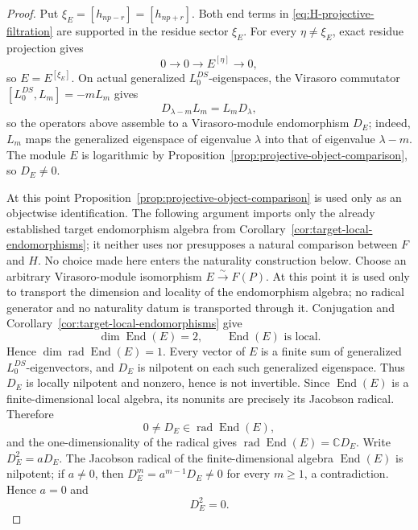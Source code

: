 \documentclass[12pt,leqno]{amsart}
\numberwithin{equation}{section}
\newcommand{\End}{\operatorname{End}}
\newcommand{\rad}{\operatorname{rad}}
\def\C{\mathbb{C}}
\begin{document}
\begin{proof}
Put $\xi_E=[h_{np-r}]=[h_{np+r}]$.  Both end terms in
\eqref{eq:H-projective-filtration} are supported in the residue sector
$\xi_E$.  For every $\eta\ne\xi_E$, exact residue projection gives
\[
 0\longrightarrow0\longrightarrow E^{[\eta]}\longrightarrow0,
\]
so $E=E^{[\xi_E]}$.  On actual generalized $L^{DS}_0$-eigenspaces, the
Virasoro commutator $[L^{DS}_0,L_m]=-mL_m$ gives
\[
 D_{\lambda-m}L_m=L_mD_\lambda,
\]
so the operators above assemble to a Virasoro-module endomorphism $D_E$;
indeed, $L_m$ maps the generalized eigenspace of eigenvalue $\lambda$
into that of eigenvalue $\lambda-m$.  The module $E$ is logarithmic by
Proposition~\ref{prop:projective-object-comparison}, so $D_E\ne0$.

At this point Proposition~\ref{prop:projective-object-comparison} is used
only as an objectwise identification.  The following argument imports
only the already established target endomorphism algebra from
Corollary~\ref{cor:target-local-endomorphisms}; it neither uses nor
presupposes a natural comparison between $F$ and $H$.  No choice made here
enters the naturality construction below.  Choose an arbitrary
Virasoro-module isomorphism $E\xrightarrow{\sim}F(P)$.  At this point it
is used only to transport the dimension and locality of the endomorphism
algebra; no radical generator and no naturality datum is transported
through it.  Conjugation and
Corollary~\ref{cor:target-local-endomorphisms} give
\[
 \dim\End(E)=2,\qquad \End(E)\text{ is local}.
\]
Hence $\dim\rad\End(E)=1$.  Every vector of $E$ is a finite sum of generalized
$L^{DS}_0$-eigenvectors, and $D_E$ is nilpotent on each such generalized
eigenspace.  Thus $D_E$ is locally nilpotent and nonzero, hence is not
invertible.  Since $\End(E)$ is a finite-dimensional local algebra, its
nonunits are precisely its Jacobson radical.  Therefore
\[
 0\ne D_E\in\rad\End(E),
\]
and the one-dimensionality of the radical gives
$\rad\End(E)=\C D_E$.  Write $D_E^2=aD_E$.  The Jacobson radical of the
finite-dimensional algebra $\End(E)$ is nilpotent; if $a\ne0$, then
$D_E^m=a^{m-1}D_E\ne0$ for every $m\ge1$, a contradiction.  Hence
$a=0$ and
\[
 D_E^2=0.
\]


\end{proof}
\end{document}
